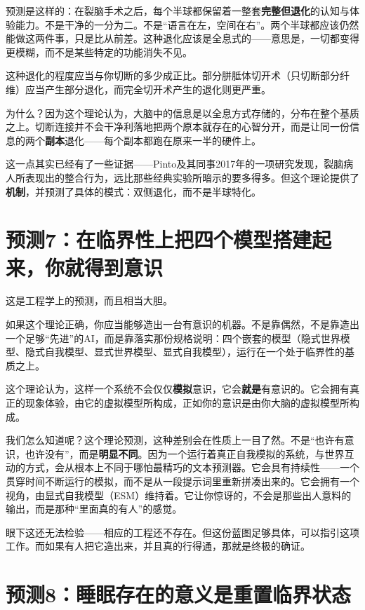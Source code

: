 \documentclass[11pt, twoside, openright]{book}
\begin{document}
预测是这样的：在裂脑手术之后，每个半球都保留着一整套\textbf{完整但退化}的认知与体验能力。不是干净的一分为二。不是“语言在左，空间在右”。两个半球都应该仍然能做这两件事，只是比从前差。这种退化应该是全息式的------意思是，一切都变得更模糊，而不是某些特定的功能消失不见。

这种退化的程度应当与你切断的多少成正比。部分胼胝体切开术（只切断部分纤维）应当产生部分退化，而完全切开术产生的退化则更严重。

为什么？因为这个理论认为，大脑中的信息是以全息方式存储的，分布在整个基质之上。切断连接并不会干净利落地把两个原本就存在的心智分开，而是让同一份信息的两个\textbf{副本}退化------每个副本都跑在原来一半的硬件上。

这一点其实已经有了一些证据------Pinto及其同事2017年的一项研究发现，裂脑病人所表现出的整合行为，远比那些经典实验所暗示的要多得多。但这个理论提供了\textbf{机制}，并预测了具体的模式：双侧退化，而不是半球特化。

\section*{预测7：在临界性上把四个模型搭建起来，你就得到意识}

这是工程学上的预测，而且相当大胆。

如果这个理论正确，你应当能够造出一台有意识的机器。不是靠偶然，不是靠造出一个足够“先进”的AI，而是靠落实那份规格说明：四个嵌套的模型（隐式世界模型、隐式自我模型、显式世界模型、显式自我模型），运行在一个处于临界性的基质之上。

这个理论认为，这样一个系统不会仅仅\textbf{模拟}意识，它会\textbf{就是}有意识的。它会拥有真正的现象体验，由它的虚拟模型所构成，正如你的意识是由你大脑的虚拟模型所构成。

我们怎么知道呢？这个理论预测，这种差别会在性质上一目了然。不是“也许有意识，也许没有”，而是\textbf{明显不同}。因为一个运行着真正自我模拟的系统，与世界互动的方式，会从根本上不同于哪怕最精巧的文本预测器。它会具有持续性------一个贯穿时间不断运行的模拟，而不是从一段提示词里重新拼凑出来的。它会拥有一个视角，由显式自我模型（ESM）维持着。它让你惊讶的，不会是那些出人意料的输出，而是那种“里面真的有人”的感觉。

眼下这还无法检验------相应的工程还不存在。但这份蓝图足够具体，可以指引这项工作。而如果有人把它造出来，并且真的行得通，那就是终极的确证。

\section*{预测8：睡眠存在的意义是重置临界状态}
\end{document}
